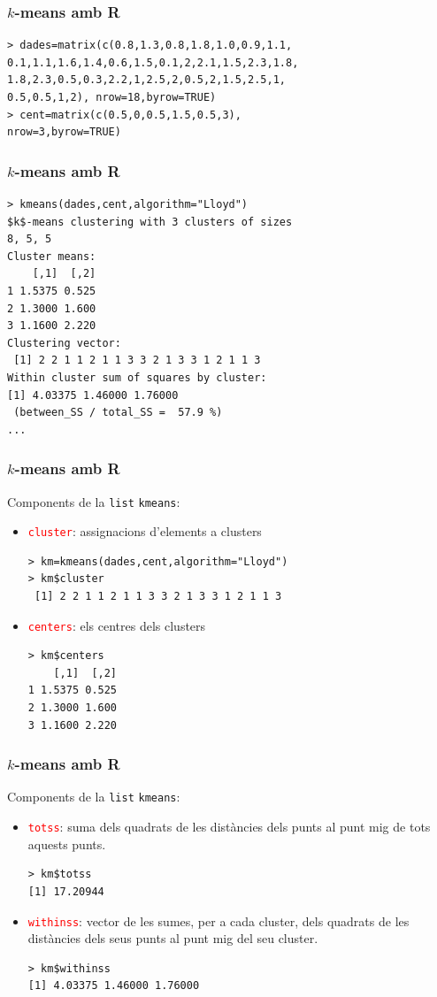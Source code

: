 \documentclass[12pt,t]{beamer}
\newcommand{\red}[1]{\textcolor{red}{#1}}
\theoremstyle{plain}
\theoremstyle{definition}
\begin{document}
\begin{frame}[fragile]
\frametitle{$k$-means amb R}

\begin{verbatim}
> dades=matrix(c(0.8,1.3,0.8,1.8,1.0,0.9,1.1,
0.1,1.1,1.6,1.4,0.6,1.5,0.1,2,2.1,1.5,2.3,1.8,
1.8,2.3,0.5,0.3,2.2,1,2.5,2,0.5,2,1.5,2.5,1,
0.5,0.5,1,2), nrow=18,byrow=TRUE) 
> cent=matrix(c(0.5,0,0.5,1.5,0.5,3),
nrow=3,byrow=TRUE)
\end{verbatim}


\end{frame}

\begin{frame}[fragile]
\frametitle{$k$-means amb R}

\begin{verbatim}
> kmeans(dades,cent,algorithm="Lloyd")
$k$-means clustering with 3 clusters of sizes 
8, 5, 5
Cluster means:
    [,1]  [,2]
1 1.5375 0.525
2 1.3000 1.600
3 1.1600 2.220
Clustering vector:
 [1] 2 2 1 1 2 1 1 3 3 2 1 3 3 1 2 1 1 3
Within cluster sum of squares by cluster:
[1] 4.03375 1.46000 1.76000
 (between_SS / total_SS =  57.9 %)
...
\end{verbatim}
\end{frame}


\begin{frame}[fragile]
\frametitle{$k$-means amb R}
Components de la \texttt{list} \texttt{kmeans}:

\begin{itemize}
\item \red{\texttt{cluster}}: assignacions d'elements a clusters
\begin{verbatim}
> km=kmeans(dades,cent,algorithm="Lloyd")
> km$cluster
 [1] 2 2 1 1 2 1 1 3 3 2 1 3 3 1 2 1 1 3
\end{verbatim}
\item \red{\texttt{centers}}: els centres dels clusters
\begin{verbatim}
> km$centers
    [,1]  [,2]
1 1.5375 0.525
2 1.3000 1.600
3 1.1600 2.220
\end{verbatim}
\end{itemize}
\end{frame}


\begin{frame}[fragile]
\frametitle{$k$-means amb R}
Components de la \texttt{list} \texttt{kmeans}:

\begin{itemize}
\item \red{\texttt{totss}}: suma dels quadrats de les distàncies dels punts al punt mig de tots aquests punts.
\begin{verbatim}
> km$totss  
[1] 17.20944
\end{verbatim}
\item \red{\texttt{withinss}}: vector de les sumes, per a cada cluster, dels quadrats de les distàncies dels seus punts al punt mig del seu cluster.
\begin{verbatim}
> km$withinss
[1] 4.03375 1.46000 1.76000
\end{verbatim}
\end{itemize}
\end{frame}
\end{document}
